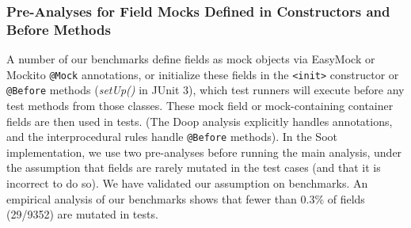 
\subsubsection{Pre-Analyses for Field Mocks Defined in Constructors and Before Methods}
\label{subsubsec:pre-analysis} 
A number of our benchmarks define fields as mock objects via EasyMock or Mockito \texttt{@Mock} annotations, or initialize these fields in the \texttt{<init>} constructor or \texttt{@Before} methods (\textit{setUp()} in JUnit 3), which test runners will execute before any test methods from those classes. These mock field or mock-containing container fields are then used in tests. (The Doop analysis explicitly handles annotations, and the interprocedural rules handle \texttt{@Before} methods). In the Soot implementation, we use two pre-analyses before running the main analysis, under the assumption that fields are rarely mutated in the test cases (and that it is incorrect to do so). We have validated our assumption on benchmarks. An empirical analysis of our benchmarks shows that fewer than 0.3\% of fields (29/9352) are mutated in tests.


